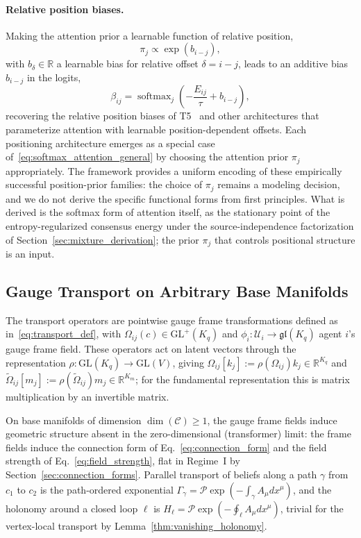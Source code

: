 \documentclass[11pt]{article}
\begin{document}
\paragraph{Relative position biases.}
Making the attention prior a learnable function of relative position,
\begin{equation}
\pi_j \propto \exp(b_{i-j}),
\label{eq:relative_bias_prior}
\end{equation}
with $b_\delta \in \mathbb{R}$ a learnable bias for relative offset $\delta = i - j$, leads to an additive bias $b_{i-j}$ in the logits,
\begin{equation}
\beta_{ij} = \operatorname{softmax}_j\left(-\frac{E_{ij}}{\tau} + b_{i-j}\right),
\label{eq:relative_bias_attention}
\end{equation}
recovering the relative position biases of T5~\cite{raffel2020exploring} and other architectures that parameterize attention with learnable position-dependent offsets. Each positioning architecture emerges as a special case of~\eqref{eq:softmax_attention_general} by choosing the attention prior $\pi_j$ appropriately. The framework provides a uniform encoding of these empirically successful position-prior families: the choice of $\pi_j$ remains a modeling decision, and we do not derive the specific functional forms from first principles. What is derived is the softmax form of attention itself, as the stationary point of the entropy-regularized consensus energy under the source-independence factorization of Section~\ref{sec:mixture_derivation}; the prior $\pi_j$ that controls positional structure is an input.

\subsection{Gauge Transport on Arbitrary Base Manifolds}
\label{sec:gauge_transport_arbitrary}

The transport operators are pointwise gauge frame transformations defined as in~\eqref{eq:transport_def}, with $\Omega_{ij}(c) \in \mathrm{GL}^+(K_q)$ and $\phi_i: \mathcal{U}_i \to \mathfrak{gl}(K_q)$ agent $i$'s gauge frame field. These operators act on latent vectors through the representation $\rho: \mathrm{GL}(K_q) \to \mathrm{GL}(V)$, giving $\Omega_{ij}[k_j] := \rho(\Omega_{ij})  k_j \in \mathbb{R}^{K_q}$ and $\tilde{\Omega}_{ij}[m_j] := \rho(\tilde{\Omega}_{ij})  m_j \in \mathbb{R}^{K_m}$; for the fundamental representation this is matrix multiplication by an invertible matrix.

On base manifolds of dimension $\dim(\mathcal{C}) \geq 1$, the gauge frame fields induce geometric structure absent in the zero-dimensional (transformer) limit: the frame fields induce the connection form of Eq.~\eqref{eq:connection_form} and the field strength of Eq.~\eqref{eq:field_strength}, flat in Regime~I by Section~\ref{sec:connection_forms}. Parallel transport of beliefs along a path $\gamma$ from $c_1$ to $c_2$ is the path-ordered exponential $\Gamma_\gamma = \mathcal{P}\exp(-\int_\gamma A_\mu dx^\mu)$, and the holonomy around a closed loop $\ell$ is $H_{\ell} = \mathcal{P}\exp(-\oint_{\ell} A_\mu dx^\mu)$, trivial for the vertex-local transport by Lemma~\ref{thm:vanishing_holonomy}.
\end{document}
